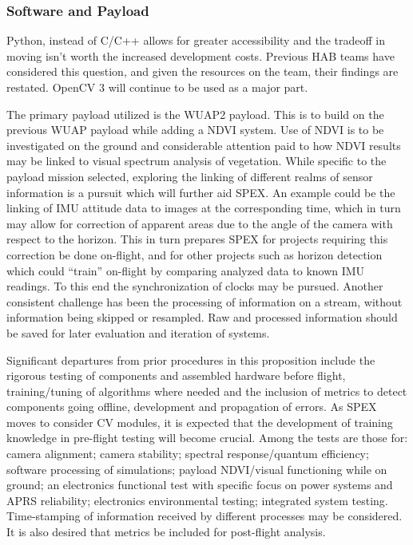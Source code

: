 \documentclass[conference]{IEEEtran} %
\begin{document}
\subsubsection{Software and Payload}
\label{deliverables-payload}
Python, instead of C/C++ allows for greater accessibility and the tradeoff in moving isn't worth the increased development costs. 
Previous HAB teams have considered this question, and given the resources on the team, their findings are restated. OpenCV 3 will continue to be used as a major part.

The primary payload utilized is the WUAP2 payload. 
This is to build on the previous WUAP payload while adding a NDVI system.
Use of NDVI is to be investigated on the ground and considerable attention paid to how NDVI results may be linked to visual spectrum analysis of vegetation. 
While specific to the payload mission selected, exploring the linking of different realms of sensor information is a pursuit which will further aid SPEX. 
An example could be the linking of IMU attitude data to images at the corresponding time, which in turn may allow for correction of apparent areas due to the angle of the camera with respect to the horizon. 
This in turn prepares SPEX for projects requiring this correction be done on-flight, and for other projects such as horizon detection which could ``train'' on-flight by comparing analyzed data to known IMU readings. 
To this end the synchronization of clocks may be pursued. 
Another consistent challenge has been the processing of information on a stream, without information being skipped or resampled. 
Raw and processed information should be saved for later evaluation and iteration of systems.

Significant departures from prior procedures in this proposition include the rigorous testing of components and assembled hardware before flight, training/tuning of algorithms where needed and the inclusion of metrics to detect components going offline, development and propagation of errors. 
As SPEX moves to consider CV modules, it is expected that the development of training knowledge in pre-flight testing will become crucial. 
Among the tests are those for: camera alignment; camera stability; spectral response/quantum efficiency; software processing of simulations; payload NDVI/visual functioning while on ground; an electronics functional test with specific focus on power systems and APRS reliability; electronics environmental testing; integrated system testing.
Time-stamping of information received by different processes may be considered. 
It is also desired that metrics be included for post-flight analysis.
\end{document}
